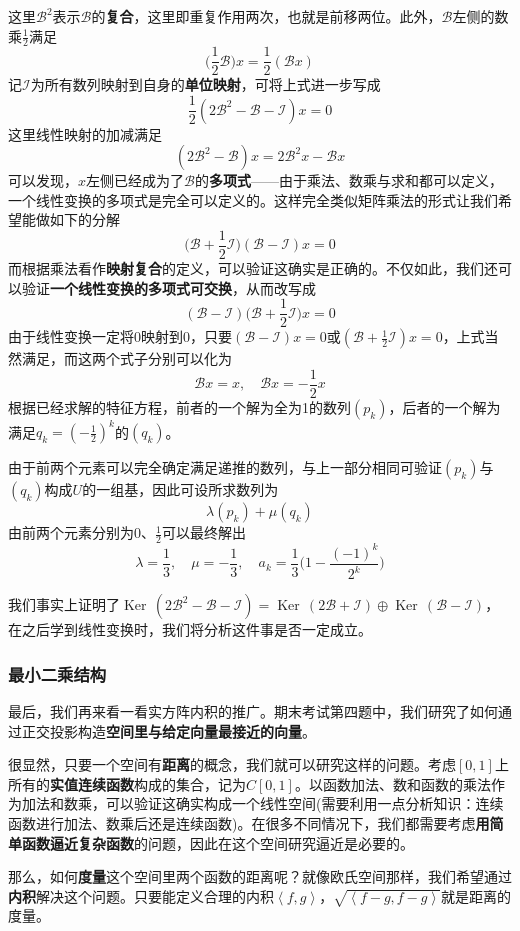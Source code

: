 \documentclass[a4paper,UTF8,fontset=windows,AutoFakeBold]{ctexart}
\DeclareMathOperator{\Ker}{Ker\,}
\newcommand*{\mb}{\mathcal{B}}
\newcommand*{\mi}{\mathcal{I}}
\newcommand*{\note}{\noindent *}
\begin{document}
这里$\mb^2$表示$\mb$的\textbf{复合}，这里即重复作用两次，也就是前移两位。此外，$\mb$左侧的数乘$\frac{1}{2}$满足
$$\bigg(\frac{1}{2}\mb\bigg)x=\frac{1}{2}(\mb x)$$
记$\mi$为所有数列映射到自身的\textbf{单位映射}，可将上式进一步写成
$$\frac{1}{2}(2\mb^2-\mb-\mi)x=0$$
这里线性映射的加减满足
$$(2\mb^2-\mb)x=2\mb^2x-\mb x$$
可以发现，$x$左侧已经成为了$\mb$的\textbf{多项式}——由于乘法、数乘与求和都可以定义，一个线性变换的多项式是完全可以定义的。这样完全类似矩阵乘法的形式让我们希望能做如下的分解
$$\bigg(\mb+\frac{1}{2}\mi\bigg)(\mb-\mi)x=0$$
而根据乘法看作\textbf{映射复合}的定义，可以验证这确实是正确的。不仅如此，我们还可以验证\textbf{一个线性变换的多项式可交换}，从而改写成
$$(\mb-\mi)\bigg(\mb+\frac{1}{2}\mi\bigg)x=0$$
由于线性变换一定将0映射到0，只要$(\mb-\mi)x=0$或$(\mb+\frac{1}{2}\mi)x=0$，上式当然满足，而这两个式子分别可以化为
$$\mb x=x,\quad\mb x=-\frac{1}{2}x$$
根据已经求解的特征方程，前者的一个解为全为1的数列$(p_k)$，后者的一个解为满足$q_k=(-\frac{1}{2})^k$的$(q_k)$。

由于前两个元素可以完全确定满足递推的数列，与上一部分相同可验证$(p_k)$与$(q_k)$构成$U$的一组基，因此可设所求数列为
$$\lambda(p_k)+\mu(q_k)$$
由前两个元素分别为0、$\frac{1}{2}$可以最终解出
$$\lambda=\frac{1}{3},\quad\mu=-\frac{1}{3},\quad a_k=\frac{1}{3}\bigg(1-\frac{(-1)^k}{2^k}\bigg)$$

\note 我们事实上证明了$\Ker(2\mb^2-\mb-\mi)=\Ker(2\mb+\mi)\oplus\Ker(\mb-\mi)$，在之后学到线性变换时，我们将分析这件事是否一定成立。

\subsubsection{最小二乘结构}
最后，我们再来看一看实方阵内积的推广。期末考试第四题中，我们研究了如何通过正交投影构造\textbf{空间里与给定向量最接近的向量}。

很显然，只要一个空间有\textbf{距离}的概念，我们就可以研究这样的问题。考虑$[0,1]$上所有的\textbf{实值连续函数}构成的集合，记为$C[0,1]$。以函数加法、数和函数的乘法作为加法和数乘，可以验证这确实构成一个线性空间(需要利用一点分析知识：连续函数进行加法、数乘后还是连续函数)。在很多不同情况下，我们都需要考虑\textbf{用简单函数逼近复杂函数}的问题，因此在这个空间研究逼近是必要的。

那么，如何\textbf{度量}这个空间里两个函数的距离呢？就像欧氏空间那样，我们希望通过\textbf{内积}解决这个问题。只要能定义合理的内积$\left<f,g\right>$，$\sqrt{\left<f-g,f-g\right>}$就是距离的度量。
\end{document}

